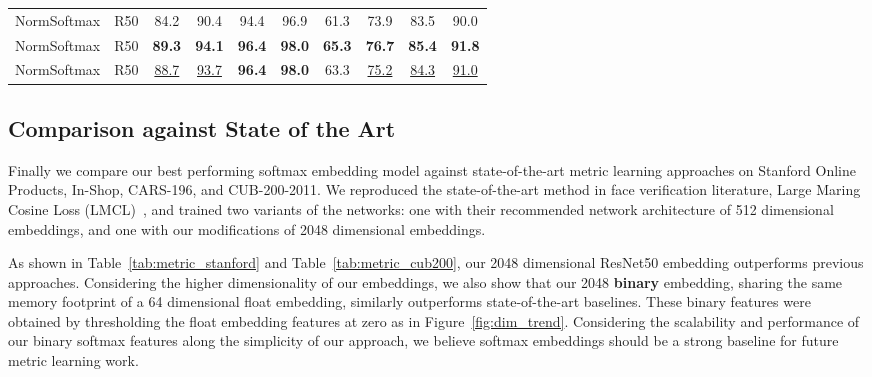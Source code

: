 \documentclass{bmvc2k}
\begin{document}
\begin{table*}
\begin{center}
{\begin{tabular}{l | c | c c c c | c c c c }
NormSoftmax  & R50 & 84.2 & 90.4 & 94.4 & 96.9  & 61.3 & 73.9 & 83.5 & 90.0 \\
NormSoftmax & R50 & \textbf{89.3} & \textbf{94.1} & \textbf{96.4} & \textbf{98.0} & \textbf{65.3} & \textbf{76.7} & \textbf{85.4} & \textbf{91.8} \\
NormSoftmax & R50 & \underline{88.7} & \underline{93.7} & \textbf{96.4} & \textbf{98.0} & 63.3 & \underline{75.2} & \underline{84.3} & \underline{91.0} \\ 
\hline
\end{tabular}
}
\end{center}
\caption{Recall@K on CARS-196 and CUB-200-2011. R - ResNet, G - GoogleNet, B - BNInception,  refers to additional attention parameters, LMCL is our method trained with the Loss}
\label{tab:metric_cub200}
\end{table*}

\subsection{Comparison against State of the Art}
\label{sec:exp_soa}

Finally we compare our best performing softmax embedding model against state-of-the-art metric learning approaches on Stanford Online Products, In-Shop, CARS-196, and CUB-200-2011. We reproduced the state-of-the-art method in face verification literature, Large Maring Cosine Loss (LMCL)~\cite{Wang2018CosFaceLM}, and trained two variants of the networks: one with their recommended network architecture of 512 dimensional embeddings, and one with our modifications of 2048 dimensional embeddings. 



As shown in Table~\ref{tab:metric_stanford} and Table~\ref{tab:metric_cub200}, our 2048 dimensional ResNet50 embedding outperforms previous approaches. Considering the higher dimensionality of our embeddings, we also show that our 2048 \textbf{binary} embedding, sharing the same memory footprint of a 64 dimensional float embedding, similarly outperforms state-of-the-art baselines. These binary features were obtained by thresholding the float embedding features at zero as in Figure~\ref{fig:dim_trend}. Considering the scalability and performance of our binary softmax features along the simplicity of our approach, we believe softmax embeddings should be a strong baseline for future metric learning work.

 
\end{document}
